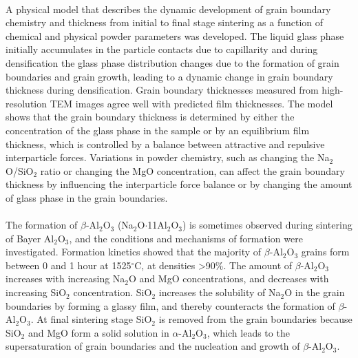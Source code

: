 \paragraph*{} A physical model that describes the dynamic development of grain boundary chemistry and thickness from initial to final stage sintering as a function of chemical and physical powder parameters was developed. The liquid glass phase initially accumulates in the particle contacts due to capillarity and during densification the glass phase distribution changes due to the formation of grain boundaries and grain growth, leading to a dynamic change in grain boundary thickness during densification. Grain boundary thicknesses measured from high-resolution TEM images agree well with predicted film thicknesses. The model shows that the grain boundary thickness is determined by either the concentration of the glass phase in the sample or by an equilibrium film thickness, which is controlled by a balance between attractive and repulsive interparticle forces. Variations in powder chemistry, such as changing the Na$_{2}$O/SiO$_{2}$ ratio or changing the MgO concentration, can affect the grain boundary thickness by influencing the interparticle force balance or by changing the amount of glass phase in the grain boundaries. 
\paragraph*{} The formation of $\beta$-Al$_{2}$O$_{3}$ (Na$_{2}$O$\cdot$11Al$_{2}$O$_{3}$) is sometimes observed during sintering of Bayer Al$_{2}$O$_{3}$, and the conditions and mechanisms of formation were investigated. Formation kinetics showed that the majority of $\beta$-Al$_{2}$O$_{3}$ grains form between 0 and 1 hour at 1525$^{\circ}$C, at densities >90\%. The amount of $\beta$-Al$_{2}$O$_{3}$ increases with increasing Na$_{2}$O and MgO concentrations, and decreases with increasing SiO$_{2}$ concentration. SiO$_{2}$ increases the solubility of Na$_{2}$O in the grain boundaries by forming a glassy film, and thereby counteracts the formation of $\beta$-Al$_{2}$O$_{3}$. At final sintering stage SiO$_{2}$ is removed from the grain boundaries because SiO$_{2}$ and MgO form a solid solution in $\alpha$-Al$_{2}$O$_{3}$, which leads to the supersaturation of grain boundaries and the nucleation and growth of $\beta$-Al$_{2}$O$_{3}$.

